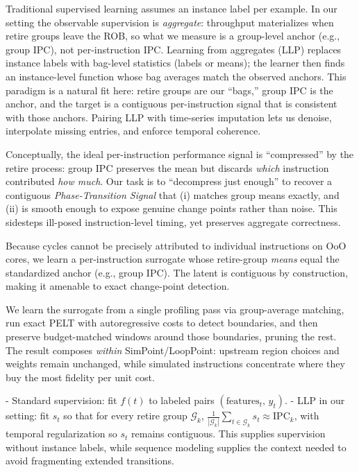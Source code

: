 \documentclass[conference]{IEEEtran}
\begin{document}
Traditional supervised learning assumes an instance label per example. In our setting the observable supervision is \emph{aggregate}: throughput materializes when retire groups leave the ROB, so what we measure is a group-level anchor (e.g., group IPC), not per-instruction IPC. Learning from aggregates (LLP) replaces instance labels with bag-level statistics (labels or means); the learner then finds an instance-level function whose bag averages match the observed anchors. This paradigm is a natural fit here: retire groups are our “bags,” group IPC is the anchor, and the target is a contiguous per-instruction signal that is consistent with those anchors. Pairing LLP with time-series imputation lets us denoise, interpolate missing entries, and enforce temporal coherence.

Conceptually, the ideal per-instruction performance signal is “compressed” by the retire process: group IPC preserves the mean but discards \emph{which} instruction contributed \emph{how much}. Our task is to “decompress just enough” to recover a contiguous \emph{Phase-Transition Signal} that (i) matches group means exactly, and (ii) is smooth enough to expose genuine change points rather than noise. This sidesteps ill-posed instruction-level timing, yet preserves aggregate correctness.

Because cycles cannot be precisely attributed to individual instructions on OoO cores, we learn a per-instruction surrogate whose retire-group \emph{means} equal the standardized anchor (e.g., group IPC). The latent is contiguous by construction, making it amenable to exact change-point detection.

We learn the surrogate from a single profiling pass via group-average matching, run exact \textsc{PELT} with autoregressive costs to detect boundaries, and then preserve budget-matched windows around those boundaries, pruning the rest. The result composes \emph{within} SimPoint/LoopPoint: upstream region choices and weights remain unchanged, while simulated instructions concentrate where they buy the most fidelity per unit cost.

- Standard supervision: fit $f(t)$ to labeled pairs $(\text{features}_t,\,y_t)$.
- LLP in our setting: fit $s_t$ so that for every retire group $\mathcal{G}_k$,
  $\frac{1}{|\mathcal{G}_k|}\sum_{t\in\mathcal{G}_k}s_t \approx \text{IPC}_k$,
  with temporal regularization so $s_t$ remains contiguous.
This supplies supervision without instance labels, while sequence modeling supplies the context needed to avoid fragmenting extended transitions.
\end{document}
